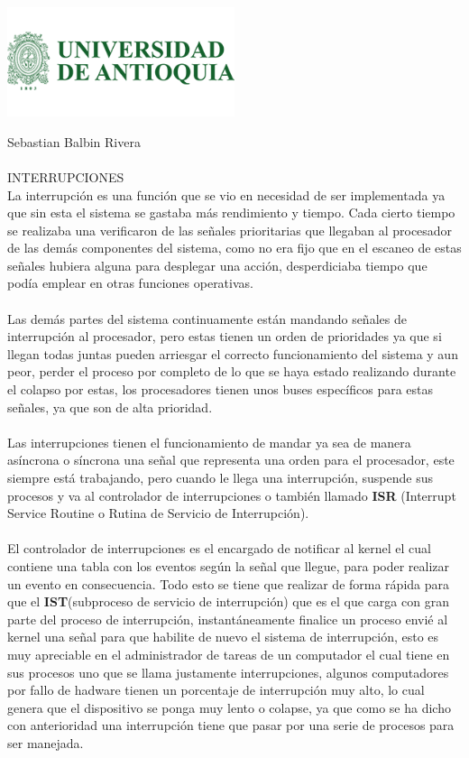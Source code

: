 \documentclass{letter}
\begin{document}
\begin{center}
\includegraphics[width=0.5\textwidth]{logo-udea.png}\\
\end{center}

Sebastian Balbin Rivera\\\\
INTERRUPCIONES\\

La interrupción es una función que se vio en necesidad de ser implementada ya que sin esta el sistema se gastaba más rendimiento y tiempo. Cada cierto tiempo se realizaba una verificaron de las señales prioritarias que llegaban al procesador de las demás componentes del sistema, como no era fijo que en el escaneo de estas señales hubiera alguna para desplegar una acción, desperdiciaba tiempo que podía emplear en otras funciones operativas. \\\\
Las demás partes del sistema continuamente están mandando señales de interrupción al procesador, pero estas tienen un orden de prioridades ya que si llegan todas juntas pueden arriesgar el correcto funcionamiento del sistema y aun peor, perder el proceso por completo de lo que se haya estado realizando durante el colapso por estas, los procesadores tienen unos buses específicos para estas señales, ya que son de alta prioridad.\\\\ 
Las interrupciones tienen el funcionamiento de mandar ya sea de manera asíncrona o síncrona una señal que representa una orden para el procesador, este siempre está trabajando, pero cuando le llega una interrupción, suspende sus procesos y va al controlador de interrupciones o también llamado \textbf{ISR} (Interrupt Service Routine o Rutina de Servicio de Interrupción).\\\\
El controlador de interrupciones es el encargado de notificar al kernel el cual contiene una tabla con los eventos según la señal que llegue, para poder realizar un evento en consecuencia. Todo esto se tiene que realizar de forma rápida para que el \textbf{IST}(subproceso de servicio de interrupción) que es el que carga con gran parte del proceso de interrupción, instantáneamente finalice un proceso envié al kernel una señal para que habilite de nuevo el sistema de interrupción, esto es muy apreciable en el administrador de tareas de un computador el cual tiene en sus procesos uno que se llama justamente interrupciones, algunos computadores por fallo de hadware tienen un porcentaje de interrupción muy alto, lo cual genera que el dispositivo se ponga muy lento o colapse, ya que como se ha dicho con anterioridad una interrupción tiene que pasar por una serie de procesos para ser manejada.\\\\
\end{document}
